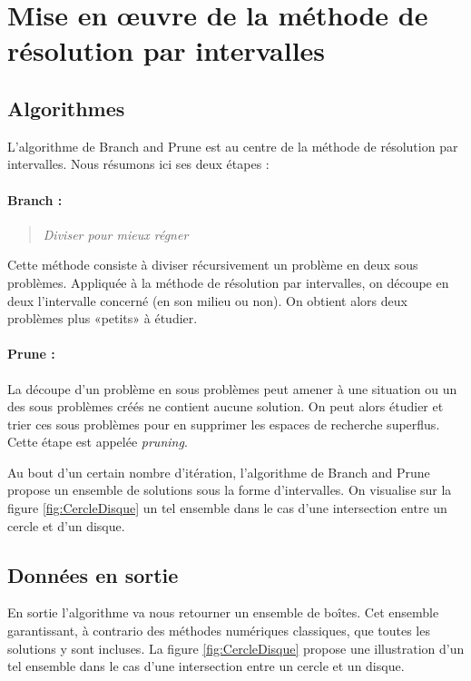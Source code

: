 \section{Mise en œuvre de la méthode de résolution par intervalles}



\subsection{Algorithmes}
L'algorithme de Branch and Prune  est au centre de la méthode de résolution par intervalles. Nous résumons ici ses deux étapes :  %
\paragraph{Branch :}
\begin{quote}\emph{Diviser pour mieux régner}\end{quote} Cette méthode consiste à diviser récursivement un problème en deux sous problèmes. Appliquée à la méthode de résolution par intervalles, on découpe en deux l'intervalle concerné (en son milieu ou non). On obtient alors deux problèmes plus «petits» à étudier.%

\paragraph{Prune :}
La découpe d'un problème en sous problèmes peut amener à une situation ou un des sous problèmes créés ne contient aucune solution. On peut alors étudier et trier ces sous problèmes pour en supprimer les espaces de recherche superflus. Cette étape est appelée \emph{pruning}.

Au bout d'un certain nombre d'itération, l'algorithme de Branch and Prune propose un ensemble de solutions sous la forme d'intervalles. On visualise sur la figure \ref{fig:CercleDisque} un tel ensemble dans le cas d'une intersection entre un cercle et d'un disque.





\subsection{Données en sortie}
En sortie l'algorithme va nous retourner un ensemble de boîtes. Cet ensemble garantissant, à contrario des méthodes numériques classiques, que toutes les solutions y sont incluses. La figure \ref{fig:CercleDisque} propose une illustration d'un tel ensemble dans le cas d'une intersection entre un cercle et un disque.

